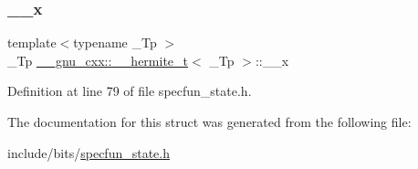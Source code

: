 \subsubsection{\texorpdfstring{\+\_\+\+\_\+x}{\_\_x}}
{\footnotesize\ttfamily template$<$typename \+\_\+\+Tp $>$ \\
\+\_\+\+Tp \hyperlink{struct____gnu__cxx_1_1____hermite__t}{\+\_\+\+\_\+gnu\+\_\+cxx\+::\+\_\+\+\_\+hermite\+\_\+t}$<$ \+\_\+\+Tp $>$\+::\+\_\+\+\_\+x}



Definition at line 79 of file specfun\+\_\+state.\+h.



The documentation for this struct was generated from the following file\+:\begin{DoxyCompactItemize}
\item 
include/bits/\hyperlink{specfun__state_8h}{specfun\+\_\+state.\+h}\end{DoxyCompactItemize}
